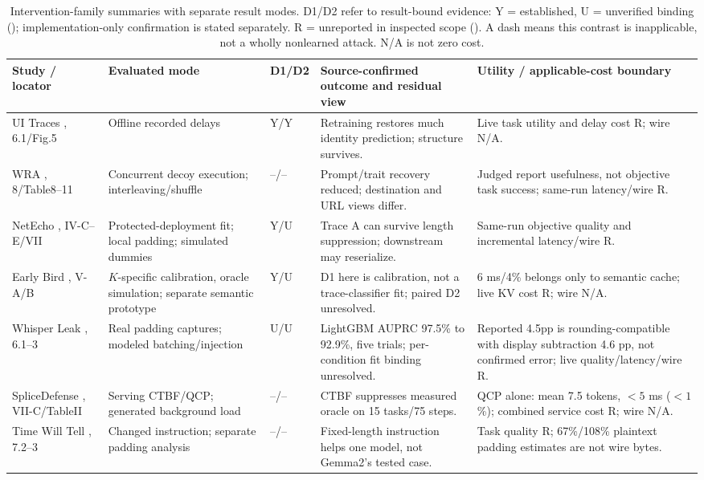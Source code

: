 \begin{table}[tp]
\centering\footnotesize
\setlength{\tabcolsep}{3pt}\renewcommand{\arraystretch}{1.12}
\caption{Intervention-family summaries with separate result modes. D1/D2 refer to result-bound evidence: Y = established, U = unverified binding (\NRV{}); implementation-only confirmation is stated separately. R = unreported in inspected scope (\NRR{}). A dash means this contrast is inapplicable, not a wholly nonlearned attack. N/A is not zero cost.}
\label{tab:defense-comparison}
\begin{tabularx}{\textwidth}{@{}p{}p{}p{}YY@{}}
\toprule Study / locator & Evaluated mode & D1/D2 & Source-confirmed outcome and residual view & Utility / applicable-cost boundary \\
\midrule
UI Traces \cite{uitraces2026}, 6.1/Fig.5 & Offline recorded delays & Y/Y & Retraining restores much identity prediction; structure survives. & Live task utility and delay cost R; wire N/A. \\
WRA \cite{jeong2026wra}, 8/Table8--11 & Concurrent decoy execution; interleaving/shuffle & --/-- & Prompt/trait recovery reduced; destination and URL views differ. & Judged report usefulness, not objective task success; same-run latency/wire R. \\
NetEcho \cite{netecho2025}, IV-C--E/VII & Protected-deployment fit; local padding; simulated dummies & Y/U & Trace A can survive length suppression; downstream may reserialize. & Same-run objective quality and incremental latency/wire R. \\
Early Bird \cite{earlybird2025}, V-A/B & $K$-specific calibration, oracle simulation; separate semantic prototype & Y/U & D1 here is calibration, not a trace-classifier fit; paired D2 unresolved. & 6 ms/4\% belongs only to semantic cache; live KV cost R; wire N/A. \\
Whisper Leak \cite{whisperleak2025}, 6.1--3 & Real padding captures; modeled batching/injection & U/U & LightGBM AUPRC 97.5\% to 92.9\%, five trials; per-condition fit binding unresolved. & Reported 4.5pp is rounding-compatible with display subtraction 4.6 pp, not confirmed error; live quality/latency/wire R. \\
SpliceDefense \cite{spliceleak2026}, VII-C/TableII & Serving CTBF/QCP; generated background load & --/-- & CTBF suppresses measured oracle on 15 tasks/75 steps. & QCP alone: mean 7.5 tokens, $<5$ ms ($<1$\%); combined service cost R; wire N/A. \\
Time Will Tell \cite{timewilltell2024}, 7.2--3 & Changed instruction; separate padding analysis & --/-- & Fixed-length instruction helps one model, not Gemma2's tested case. & Task quality R; 67\%/108\% plaintext padding estimates are not wire bytes. \\

\end{tabularx}
\end{table}
